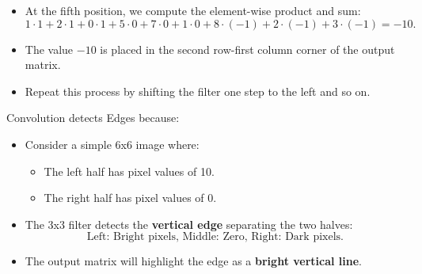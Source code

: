 \documentclass[letterpaper,12pt,notitlepage,twoside]{report}
\begin{document}

\begin{itemize}[nosep]
    \item At the fifth position, we compute the element-wise product and sum:
    \[
    1 \cdot 1 + 2 \cdot 1 + 0 \cdot 1 + 5 \cdot 0 + 7 \cdot 0 + 1 \cdot 0 + 8 \cdot (-1) + 2 \cdot (-1) + 3 \cdot (-1) = -10.
    \]
    \item The value \(-10\) is placed in the second row-first column corner of the output matrix.
    \item Repeat this process by shifting the filter one step to the left and so on.
\end{itemize}

Convolution detects Edges because:
\begin{itemize}
    \item Consider a simple 6x6 image where:
    \begin{itemize}
        \item The left half has pixel values of 10.
        \item The right half has pixel values of 0.
    \end{itemize}
    \item The 3x3 filter detects the \textbf{vertical edge} separating the two halves:
    \[
    \text{Left: Bright pixels, Middle: Zero, Right: Dark pixels}.
    \]
    \item The output matrix will highlight the edge as a \textbf{bright vertical line}.
\end{itemize}
\end{document}
